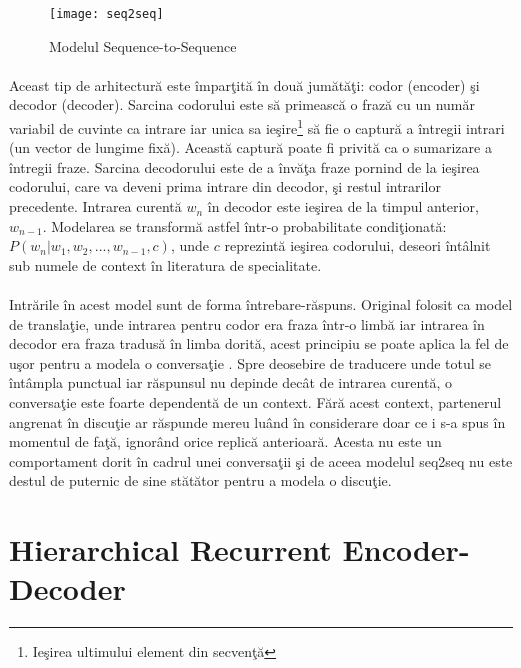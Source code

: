 \begin{figure}[H]
\centering
\texttt{[image: seq2seq]}
\caption{Modelul Sequence-to-Sequence}
\end{figure}

\paragraph{}
Aceast tip de arhitectur\u a este \^ impar\c tit\u a \^ in dou\u a jum\u at\u a\c ti: codor (encoder) \c si decodor (decoder). Sarcina codorului este s\u a primeasc\u a o fraz\u a cu un num\u ar variabil de cuvinte ca intrare iar unica sa ie\c sire\footnote{Ie\c sirea ultimului element din secven\c t\u a} s\u a fie o captur\u a a \^ intregii intrari (un vector de lungime fix\u a). Aceast\u a captur\u a poate fi privit\u a ca o sumarizare a \^ intregii fraze. Sarcina decodorului este de a \^ inv\u a\c ta fraze pornind de la ie\c sirea codorului, care va deveni prima intrare din decodor, \c si restul intrarilor precedente. Intrarea curent\u a \(w_{n}\) \^ in decodor este ie\c sirea de la timpul anterior, \(w_{n-1}\). Modelarea se transform\u a astfel \^ intr-o probabilitate condi\c tionat\u a: \(P(w_{n} | w_{1}, w_{2},..., w_{n-1}, c)\), unde \(c\) reprezint\u a ie\c sirea codorului, deseori \^ int\^ alnit sub numele de context \^ in literatura de specialitate.

\paragraph{}
Intr\u arile \^ in acest model sunt de forma \^ intrebare-r\u aspuns. Original folosit ca model de transla\c tie, unde intrarea pentru codor era fraza \^ intr-o limb\u a iar intrarea \^ in decodor era fraza tradus\u a \^ in limba dorit\u a, acest principiu se poate aplica la fel de u\c sor pentru a modela o conversa\c tie \cite{seq2seq-chatbots}. Spre deosebire de traducere unde totul se \^ int\^ ampla punctual iar r\u aspunsul nu depinde dec\^ at de intrarea curent\u a, o conversa\c tie este foarte dependent\u a de un context. F\u ar\u a acest context, partenerul angrenat \^ in discu\c tie ar r\u aspunde mereu lu\^ and \^ in considerare doar ce i s-a spus \^ in momentul de fa\c t\u a, ignor\^ and orice replic\u a anterioar\u a. Acesta nu este un comportament dorit \^ in cadrul unei conversa\c tii \c si de aceea modelul seq2seq nu este destul de puternic de sine st\u at\u ator pentru a modela o discu\c tie.

\section{Hierarchical Recurrent Encoder-Decoder}

